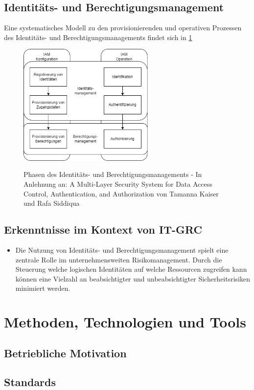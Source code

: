 \documentclass[12pt]{article}
\begin{document}
\subsection{Identitäts- und Berechtigungsmanagement}
Eine systematisches Modell zu den provisionierenden und operativen Prozessen des Identitäts- und Berechtigungsmanagements findet sich in \cref{fig:iamphases}
\begin{figure}[H]
  \centering
  \includegraphics[width=0.6\textwidth]{assets/iam-phases.png}
  \label{fig:iamphases}
  \caption{Phasen des Identitäts- und Berechtigungsmanagements - In Anlehnung an: A Multi-Layer Security System for Data Access Control, Authentication, and Authorization von Tamanna Kaiser und Rafa Siddiqua}
\end{figure}
\subsection{Erkenntnisse im Kontext von IT-GRC}
\begin{itemize}
  \item Die Nutzung von Identitäts- und Berechtigungsmanagement spielt eine zentrale Rolle im unternehmensweiten Risikomanagement. Durch die Steuerung welche logischen Identitäten auf welche Ressourcen zugreifen kann können eine Vielzahl an beabsichtigter und unbeabsichtigter Sicherheitsrisiken minimiert werden.
\end{itemize}
\section{Methoden, Technologien und Tools}
\label{sec:existing}
\subsection{Betriebliche Motivation}
\subsection{Standards}
\end{document}
